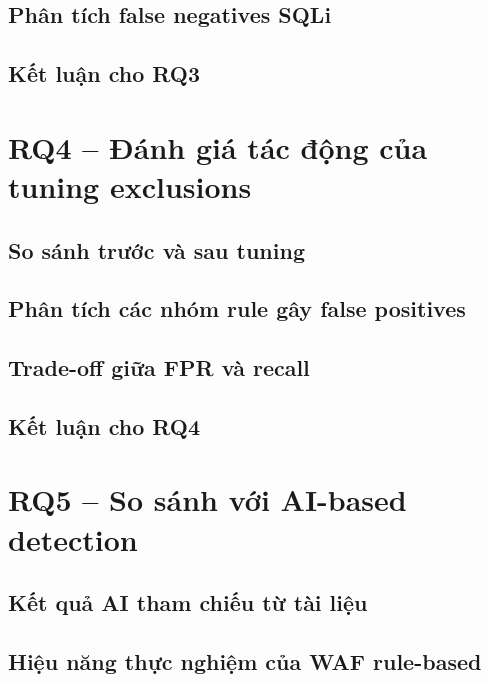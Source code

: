 \subsection{Phân tích false negatives SQLi}
\label{subsec:rq3-sqli-false-negatives}

\subsection{Kết luận cho RQ3}
\label{subsec:rq3-conclusion}

\section{RQ4 -- Đánh giá tác động của tuning exclusions}
\label{sec:rq4-tuning-exclusions-impact}

\subsection{So sánh trước và sau tuning}
\label{subsec:rq4-before-after-tuning}

\subsection{Phân tích các nhóm rule gây false positives}
\label{subsec:rq4-fp-rule-groups}

\subsection{Trade-off giữa FPR và recall}
\label{subsec:rq4-fpr-recall-tradeoff}

\subsection{Kết luận cho RQ4}
\label{subsec:rq4-conclusion}

\section{RQ5 -- So sánh với AI-based detection}
\label{sec:rq5-ai-based-comparison}

\subsection{Kết quả AI tham chiếu từ tài liệu}
\label{subsec:rq5-ai-reference-results}

\subsection{Hiệu năng thực nghiệm của WAF rule-based}
\label{subsec:rq5-waf-performance-results}

